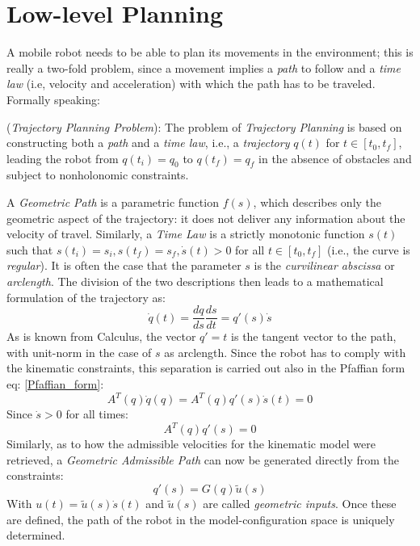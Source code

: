 \section{Low-level Planning}
A mobile robot needs to be able to plan its movements in the environment; this is really a two-fold problem, since a movement implies a \textit{path} to follow and a \textit{time law} (i.e, velocity and acceleration) with which the path has to be traveled. Formally speaking:
\begin{definition}\label{trajecotry_planning_problem}
    (\textit{Trajectory Planning Problem}): The problem of \textit{Trajectory Planning} is based on constructing both a \textit{path} and a \textit{time law}, i.e., a \textit{trajectory} $q(t)$ for $t\in [t_0, t_f]$, leading the robot from $q(t_i)=q_0$ to $q(t_f)=q_f$ in the absence of obstacles and subject to nonholonomic constraints.
\end{definition}
A \textit{Geometric Path} is a parametric function $f(s)$, which describes only the geometric aspect of the trajectory: it does not deliver any information about the velocity of travel. Similarly, a \textit{Time Law} is a strictly monotonic function $s(t)$ such that $s(t_i)=s_i,s(t_f)=s_f,\dot{s}(t)>0$ for all $t \in [t_0,t_f]$ (i.e., the curve is \textit{regular}). It is often the case that the parameter $s$ is the \textit{curvilinear abscissa} or \textit{arclength}. The division of the two descriptions then leads to a mathematical formulation of the trajectory as:
\begin{equation*}
    \dot{q}(t)=\frac{dq}{ds}\frac{ds}{dt}=q'(s)\dot{s}
\end{equation*}
As is known from Calculus, the vector $q'=t$ is the tangent vector to the path, with unit-norm in the case of $s$ as arclength. Since the robot has to comply with the kinematic constraints, this separation is carried out also in the Pfaffian form eq: \ref{Pfaffian_form}:
\begin{equation*}
    A^T(q)\dot{q}(q)=A^T(q)q'(s)\dot{s}(t)=0
\end{equation*}
Since $\dot{s}>0$ for all times:
\begin{equation*}
    A^T(q)q'(s)=0
\end{equation*}
Similarly, as to how the admissible velocities for the kinematic model were retrieved, a \textit{Geometric Admissible Path} can now be generated directly from the constraints:
\begin{equation*}
    q'(s)=G(q)\tilde{u}(s)
\end{equation*}
With $u(t)=\tilde{u}(s)\dot{s}(t)$ and $\tilde{u}(s)$ are called \textit{geometric inputs}. Once these are defined, the path of the robot in the model-configuration space is uniquely determined.
